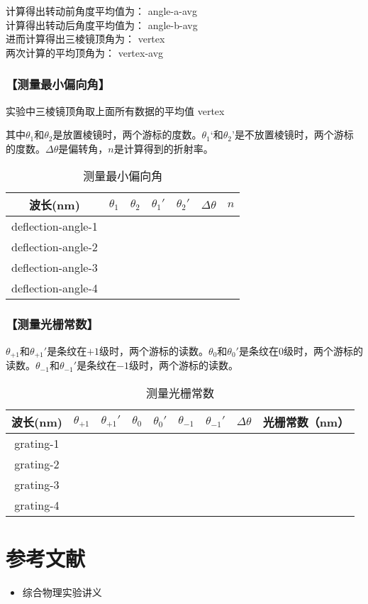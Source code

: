 \documentclass{ctexart}
\let\oldsubsubsection\subsubsection
\renewcommand{\subsubsection}[1]{\oldsubsubsection{\!\!\!\!\!\!【#1】}}
\begin{document}
计算得出转动前角度平均值为：{{ angle-a-avg }} \\
计算得出转动后角度平均值为：{{ angle-b-avg }} \\
进而计算得出三棱镜顶角为：{{ vertex }} \\
两次计算的平均顶角为：{{ vertex-avg }}

\subsubsection{测量最小偏向角}

实验中三棱镜顶角取上面所有数据的平均值 {{ vertex }}

其中$\theta_1$和$\theta_2$是放置棱镜时，两个游标的度数。$\theta_1‘$和$\theta_2’$是不放置棱镜时，两个游标的度数。$\Delta \theta$是偏转角，$n$是计算得到的折射率。

\begin{table}[H]
  \centering
  \begin{tabular}{|c|c|c|c|c|c|c|}
    \hline
     波长(nm) & $\theta_1$ & $\theta_2$ & $\theta_1'$ & $\theta_2'$ & $\Delta \theta$ & $n$\\\hline
    {{ deflection-angle-1 }}\\\hline
    {{ deflection-angle-2 }}\\\hline
    {{ deflection-angle-3 }}\\\hline
    {{ deflection-angle-4 }}\\\hline
  \end{tabular}
  \caption{测量最小偏向角}
\end{table}


\subsubsection{测量光栅常数}

$\theta_{+1}$和$\theta_{+1}'$是条纹在$+1$级时，两个游标的读数。$\theta_0$和$\theta_0'$是条纹在$0$级时，两个游标的读数。$\theta_{-1}$和$\theta_{-1}'$是条纹在$-1$级时，两个游标的读数。

\begin{table}[H]
  \centering
  \begin{tabular}{|c|c|c|c|c|c|c|c|c|}
    \hline
     波长(nm) &  $\theta_{+1}$ & $\theta_{+1}'$ & $\theta_0$ & $\theta_0'$ & $\theta_{-1}$ & $\theta_{-1}'$ & $\Delta \theta$ & 光栅常数（nm）\\\hline
    {{ grating-1 }}\\\hline
    {{ grating-2 }}\\\hline
    {{ grating-3 }}\\\hline
    {{ grating-4 }}\\\hline
  \end{tabular}
  \caption{测量光栅常数}
\end{table}

\section{参考文献}
\begin{itemize}[leftmargin=0pt]
  \item[] 综合物理实验讲义
\end{itemize}
\end{document}
